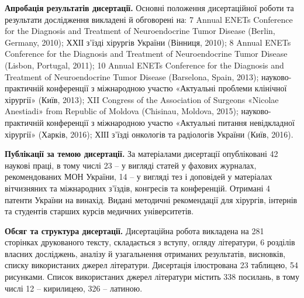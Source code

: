 \textbf{Апробація результатів дисертації.} Основні положення дисертаційної роботи та результати дослідження викладені й обговорені на: 7 Annual ENETs Conference for the Diagnosis and Treatment of Neuroendocrine Tumor Disease (Berlin, Germany, 2010); ХХІІ з’їзді хірургів України (Вінниця, 2010);
8 Annual ENETs Conference for the Diagnosis and Treatment of Neuroendocrine Tumor Disease (Lisbon, Portugal, 2011); 10 Annual ENETs Conference for the Diagnosis and Treatment of Neuroendocrine Tumor Disease (Barselona, Spain, 2013); науково-практичній конференції з міжнародною участю «Актуальні проблеми клінічної хірургії» (Київ, 2013); XII Congress of the Association of Surgeons «Nicolae Anestiadi» from Republic of Moldova (Chisinau, Moldova, 2015); науково-практичній конференції з міжнародною участю «Актуальні питання невідкладної хірургії» (Харків, 2016); ХІІІ з’їзді онкологів та радіологів України (Київ, 2016).


\textbf{Публікації за темою дисертації.} За матеріалами дисертації опубліковані 42 наукові праці, в тому числі 23 – у вигляді статей у фахових журналах, рекомендованих МОН України, 14 – у вигляді тез і доповідей у матеріалах вітчизняних та міжнародних з’їздів, конгресів та конференцій. Отримані 4 патенти України на винахід. Видані методичні рекомендації для хірургів, інтернів та студентів старших курсів медичних університетів.

\textbf{Обсяг та структура дисертації.} Дисертаційна робота викладена на 281 сторінках друкованого тексту, складається з вступу, огляду літератури, 6 розділів власних досліджень, аналізу й узагальнення отриманих результатів, висновків, списку використаних джерел літератури. Дисертація ілюстрована 23 таблицею, 54 рисунками. Список використаних джерел літератури містить 338 посилань, в тому числі 12 – кирилицею, 326 – латиною.